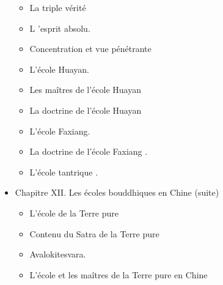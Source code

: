 \begin{itemize}
\begin{itemize}
    \end{itemize}
    \begin{itemize}
        \item La triple vérité
    \end{itemize}
    \begin{itemize}
        \item L 'esprit absolu.
    \end{itemize}
    \begin{itemize}
        \item Concentration et vue pénétrante
    \end{itemize}
    \begin{itemize}
        \item L'école Huayan.
    \end{itemize}
    \begin{itemize}
        \item Les maîtres de l'école Huayan
    \end{itemize}
    \begin{itemize}
        \item La doctrine de l'école Huayan
    \end{itemize}
    \begin{itemize}
        \item L'école Faxiang.
    \end{itemize}
    \begin{itemize}
        \item La doctrine de l'école Faxiang .
    \end{itemize}
    \begin{itemize}
        \item L'école tantrique .
    \end{itemize}
    \item Chapitre XII. Les écoles bouddhiques en Chine (suite)
    \begin{itemize}
        \item L'école de la Terre pure
    \end{itemize}
    \begin{itemize}
        \item Contenu du Satra de la Terre pure
    \end{itemize}
    \begin{itemize}
        \item Avalokitesvara.
    \end{itemize}
    \begin{itemize}
        \item L'école et les maîtres de la Terre pure en Chine

\end{itemize}
\end{itemize}
